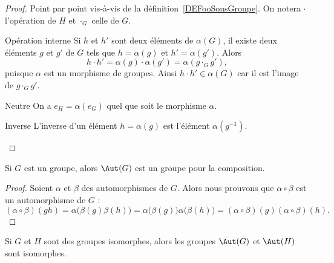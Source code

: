 \begin{proof}
	Point par point vis-à-vis de la définition~\ref{DEFooSousGroupe}. On notera \( \cdot \) l'opération de \( H \) et \( \cdot_G \) celle de \( G \).
	\begin{subproof}
		\item[Opération interne]
		Si \( h \) et \( h' \) sont deux éléments de \( \alpha(G)\), il existe deux éléments \( g \) et \( g'\) de \( G \) tels que \( h = \alpha(g) \) et \( h' = \alpha(g') \). Alors
		\[
			h \cdot h' = \alpha(g) \cdot \alpha(g') = \alpha(g\cdot_G g'),
		\]
		puisque \( \alpha \) est un morphisme de groupes. Ainsi \( h \cdot h' \in \alpha(G) \) car il est l'image de \( g\cdot_G g' \).
		\item[Neutre]
		On a \( e_H = \alpha(e_G) \) quel que soit le morphisme \( \alpha \).
		\item[Inverse]
		L'inverse d'un élément \( h = \alpha(g) \) est l'élément \( \alpha(g^{-1}) \).
	\end{subproof}
\end{proof}

\begin{lemma}       \label{LEMooKJMWooQeIwgF}
	Si \( G\) est un groupe, alors \( \Aut(G)\) est un groupe pour la composition.
\end{lemma}

\begin{proof}
	Soient \( \alpha\) et \( \beta\) des automorphismes de \( G\). Alors nous prouvons que \( \alpha\circ\beta\) est un automorphisme de \( G\) :
	\begin{equation}
		(\alpha\circ\beta)(gh)=\alpha\big( \beta(g)\beta(h) \big)=\alpha\big( \beta(g) \big)\alpha\big( \beta(h) \big)=(\alpha\circ\beta)(g)(\alpha\circ\beta)(h).
	\end{equation}
\end{proof}

\begin{lemma}       \label{LEMooDPISooRoAFmt}
	Si \( G\) et \( H\) sont des groupes isomorphes, alors les groupes \( \Aut(G)\) et \( \Aut(H)\) sont isomorphes.
\end{lemma}

